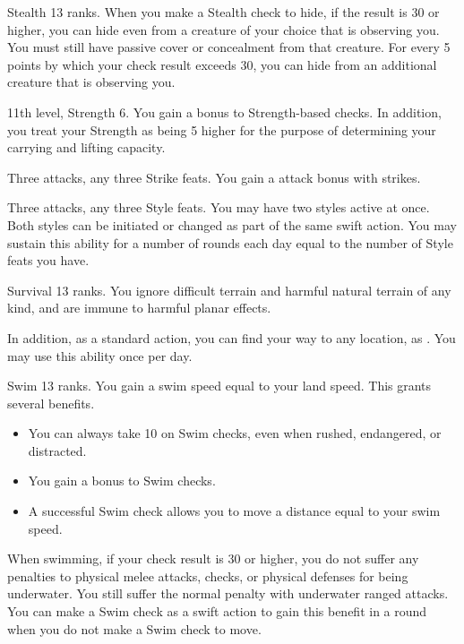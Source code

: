\featpre Stealth 13 ranks.
\featben When you make a Stealth check to hide, if the result is 30 or higher, you can hide even from a creature of your choice that is observing you.
You must still have passive cover or concealment from that creature.
For every 5 points by which your check result exceeds 30, you can hide from an additional creature that is observing you.

\featpres 11th level, Strength 6.
\featben You gain a  bonus to Strength-based checks.
In addition, you treat your Strength as being 5 higher for the purpose of determining your carrying and lifting capacity.

\featpres Three attacks, any three Strike feats.
\featben You gain a  attack bonus with strikes.

\featpres Three attacks, any three Style feats.
\featben You may have two styles active at once.
Both styles can be initiated or changed as part of the same swift action.
You may sustain this ability for a number of rounds each day equal to the number of Style feats you have.

\featpre Survival 13 ranks.
\featben You ignore difficult terrain and harmful natural terrain of any kind, and are immune to harmful planar effects.

In addition, as a standard action, you can find your way to any location, as .
You may use this ability once per day.

\featpre Swim 13 ranks.
\featben You gain a swim speed equal to your land speed.
This grants several benefits.
\begin{itemize}
    \item You can always take 10 on Swim checks, even when rushed, endangered, or distracted.
    \item You gain a  bonus to Swim checks.
    \item A successful Swim check allows you to move a distance equal to your swim speed.
\end{itemize}

When swimming, if your check result is 30 or higher, you do not suffer any penalties to physical melee attacks, checks, or physical defenses for being underwater.
You still suffer the normal penalty with underwater ranged attacks.
You can make a Swim check as a swift action to gain this benefit in a round when you do not make a Swim check to move.

